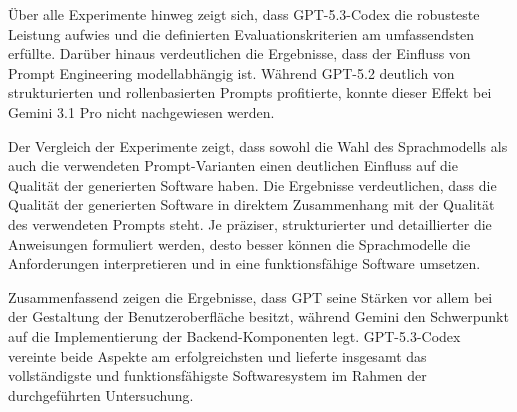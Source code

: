 Über alle Experimente hinweg zeigt sich, dass GPT-5.3-Codex die robusteste Leistung aufwies und die definierten Evaluationskriterien am umfassendsten erfüllte. Darüber hinaus verdeutlichen die Ergebnisse, dass der Einfluss von Prompt Engineering modellabhängig ist. Während GPT-5.2 deutlich von strukturierten und rollenbasierten Prompts profitierte, konnte dieser Effekt bei Gemini 3.1 Pro nicht nachgewiesen werden.

Der Vergleich der Experimente zeigt, dass sowohl die Wahl des Sprachmodells als auch die verwendeten Prompt-Varianten einen deutlichen Einfluss auf die Qualität der generierten Software haben. Die Ergebnisse verdeutlichen, dass die Qualität der generierten Software in direktem Zusammenhang mit der Qualität des verwendeten Prompts steht. Je präziser, strukturierter und detaillierter die Anweisungen formuliert werden, desto besser können die Sprachmodelle die Anforderungen interpretieren und in eine funktionsfähige Software umsetzen.


Zusammenfassend zeigen die Ergebnisse, dass GPT seine Stärken vor allem bei der Gestaltung der Benutzeroberfläche besitzt, während Gemini den Schwerpunkt auf die Implementierung der Backend-Komponenten legt. GPT-5.3-Codex vereinte beide Aspekte am erfolgreichsten und lieferte insgesamt das vollständigste und funktionsfähigste Softwaresystem im Rahmen der durchgeführten Untersuchung.
